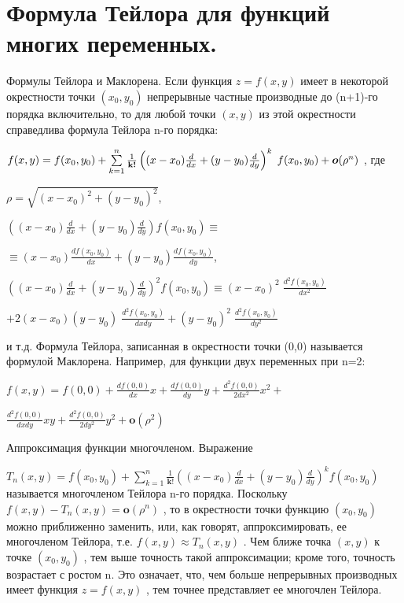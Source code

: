 \documentclass{article}
\begin{document}
\section{Формула Тейлора для функций многих переменных.}

Формулы Тейлора и Маклорена. Если функция  $z=f(x,y)$ имеет в некоторой окрестности точки
$(x_0,y_0)$ непрерывные частные производные до (n+1)-го порядка включительно, то для любой точки $(x,y)$ из этой окрестности справедлива формула Тейлора n-го порядка:

$f(x,y)= f(x_\textup{0},y_\textup{0}) + \sum\limits_{k=1}^n \frac1{\textbf{k!}} \left((x-x_0)\frac{d}{dx}+(y-y_0)\frac{d}{dy}\right)^k \; f(x_0,y_0) + \boldsymbol{o}(\rho^n)$ , где

$
\rho = \sqrt{(x-x_0)^2+(y-y_0)^2}
$,

$
\left((x-x_0)\frac{d}{dx}+(y-y_0)\frac{d}{dy}\right)f(x_0,y_0) \equiv
$

$
\equiv (x-x_0)\frac{df(x_0,y_0)}{dx}+(y-y_0)\frac{df(x_0,y_0)}{dy}
$,

$
\left((x-x_0)\frac{d}{dx}+(y-y_0)\frac{d}{dy}\right)^2 f(x_0,y_0)\equiv (x-x_0)^2 \;\frac{d^2 f(x_0,y_0)}{dx^2} 
$

$
+2(x-x_0)(y-y_0)\;\frac{d^2 f(x_0,y_0)}{dxdy}+(y-y_0)^2 \;\frac{d^2f(x_0,y_0)}{dy^2}
$

и т.д. Формула Тейлора, записанная в окрестности точки (0,0) называется формулой Маклорена. Например, для функции двух переменных при n=2:

$
f(x,y)=f(0,0)+\frac{df(0,0)}{dx}x+\frac{df(0,0)}{dy}y+\frac{d^2 f(0,0)}{2dx^2}x^2+
$

$
\frac{d^2 f(0,0)}{dxdy}xy+\frac{d^2 f(0,0)}{2dy^2}y^2+\boldsymbol{o}(\rho^2)
$

Аппроксимация функции многочленом. Выражение

$
T_n(x,y)=f(x_0,y_0)+\sum\limits_{k=1}^n \frac1{\textbf{k!}} \left((x-x_0)\frac{d}{dx}+(y-y_0)\frac{d}{dy}\right)^k f(x_0,y_0)
$
называется многочленом Тейлора n-го порядка. Поскольку $
f(x,y)-T_n(x,y)=\boldsymbol{o}(\rho^n)
$
, то в окрестности точки функцию $
(x_0,y_0)
$
можно приближенно заменить, или, как говорят, аппроксимировать, ее многочленом Тейлора, т.е.
$
f(x,y)\approx T_n(x,y)
$
. Чем ближе точка
$
(x,y)
$
к точке
$
(x_0,y_0)
$
, тем выше точность такой аппроксимации; кроме того, точность возрастает с ростом n. Это означает, что, чем больше непрерывных производных имеет функция 
$
z=f(x,y)
$
 , тем точнее представляет ее многочлен Тейлора.
\end{document}
